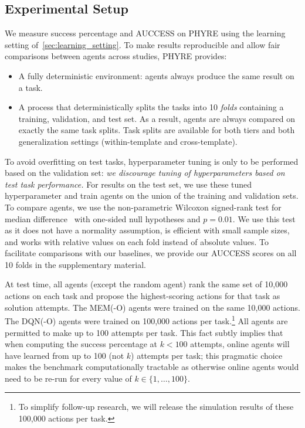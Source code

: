 \documentclass{article}
\begin{document}
\subsection{Experimental Setup}\label{sec:exp_setup}
We measure success percentage and AUCCESS on PHYRE using the learning setting of~\ref{sec:learning_setting}.
To make results reproducible and allow fair comparisons between agents across studies, PHYRE provides:
\begin{itemize}[leftmargin=*]
\setlength\itemsep{0em}
\item A fully deterministic environment: agents always produce the same result on a task.
\item A process that deterministically splits the tasks into 10 \emph{folds} containing a training, validation, and test set. As a result, agents are always compared on exactly the same task splits. Task splits are available for both tiers and both generalization settings (within-template and cross-template).
\end{itemize}
To avoid overfitting on test tasks, hyperparameter tuning is only to be performed based on the validation set: \emph{we discourage tuning of hyperparameters based on test task performance.} For results on the test set, we use these tuned hyperparameter and train agents on the union of the training and validation sets. To compare agents, we use the non-parametric Wilcoxon signed-rank test for median difference~\cite{wilcoxon1945individual} with one-sided null hypotheses and $p\!=\!0.01$.
We use this test as it does not have a normality assumption, is efficient with small sample sizes, and works with relative values on each fold instead of absolute values.
To facilitate comparisons with our baselines, we provide our AUCCESS scores on all 10 folds in the supplementary material.

At test time, all agents (except the random agent) rank the same set of 10,000 actions on each task and propose the highest-scoring actions for that task as solution attempts. The MEM(-O) agents were trained on the same 10,000 actions. The DQN(-O) agents were trained on 100,000 actions per task.\footnote{To simplify follow-up research, we will release the simulation results of these 100,000 actions per task.} All agents are permitted to make up to 100 attempts per task. This fact subtly implies that when computing the success percentage at $k\!<\!100$ attempts, online agents will have learned from up to 100 (not $k$) attempts per task; this pragmatic choice makes the benchmark computationally tractable as otherwise online agents would need to be re-run for every value of $k\!\in\!\{1,\ldots,100\}$.
\end{document}
